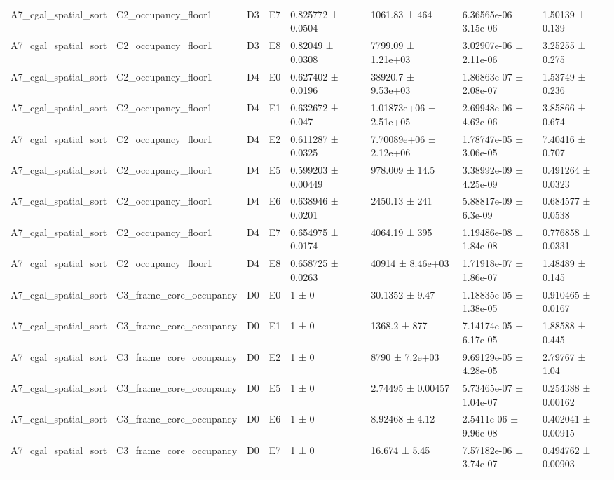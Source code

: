 \begin{table}
\begin{tabular}{lllllllll}
A7\_cgal\_spatial\_sort & C2\_occupancy\_floor1 & D3 & E7 & 0.825772 ± 0.0504 &  & 1061.83 ± 464 & 6.36565e-06 ± 3.15e-06 & 1.50139 ± 0.139 \\
A7\_cgal\_spatial\_sort & C2\_occupancy\_floor1 & D3 & E8 & 0.82049 ± 0.0308 &  & 7799.09 ± 1.21e+03 & 3.02907e-06 ± 2.11e-06 & 3.25255 ± 0.275 \\
A7\_cgal\_spatial\_sort & C2\_occupancy\_floor1 & D4 & E0 & 0.627402 ± 0.0196 &  & 38920.7 ± 9.53e+03 & 1.86863e-07 ± 2.08e-07 & 1.53749 ± 0.236 \\
A7\_cgal\_spatial\_sort & C2\_occupancy\_floor1 & D4 & E1 & 0.632672 ± 0.047 &  & 1.01873e+06 ± 2.51e+05 & 2.69948e-06 ± 4.62e-06 & 3.85866 ± 0.674 \\
A7\_cgal\_spatial\_sort & C2\_occupancy\_floor1 & D4 & E2 & 0.611287 ± 0.0325 &  & 7.70089e+06 ± 2.12e+06 & 1.78747e-05 ± 3.06e-05 & 7.40416 ± 0.707 \\
A7\_cgal\_spatial\_sort & C2\_occupancy\_floor1 & D4 & E5 & 0.599203 ± 0.00449 &  & 978.009 ± 14.5 & 3.38992e-09 ± 4.25e-09 & 0.491264 ± 0.0323 \\
A7\_cgal\_spatial\_sort & C2\_occupancy\_floor1 & D4 & E6 & 0.638946 ± 0.0201 &  & 2450.13 ± 241 & 5.88817e-09 ± 6.3e-09 & 0.684577 ± 0.0538 \\
A7\_cgal\_spatial\_sort & C2\_occupancy\_floor1 & D4 & E7 & 0.654975 ± 0.0174 &  & 4064.19 ± 395 & 1.19486e-08 ± 1.84e-08 & 0.776858 ± 0.0331 \\
A7\_cgal\_spatial\_sort & C2\_occupancy\_floor1 & D4 & E8 & 0.658725 ± 0.0263 &  & 40914 ± 8.46e+03 & 1.71918e-07 ± 1.86e-07 & 1.48489 ± 0.145 \\
A7\_cgal\_spatial\_sort & C3\_frame\_core\_occupancy & D0 & E0 & 1 ± 0 &  & 30.1352 ± 9.47 & 1.18835e-05 ± 1.38e-05 & 0.910465 ± 0.0167 \\
A7\_cgal\_spatial\_sort & C3\_frame\_core\_occupancy & D0 & E1 & 1 ± 0 &  & 1368.2 ± 877 & 7.14174e-05 ± 6.17e-05 & 1.88588 ± 0.445 \\
A7\_cgal\_spatial\_sort & C3\_frame\_core\_occupancy & D0 & E2 & 1 ± 0 &  & 8790 ± 7.2e+03 & 9.69129e-05 ± 4.28e-05 & 2.79767 ± 1.04 \\
A7\_cgal\_spatial\_sort & C3\_frame\_core\_occupancy & D0 & E5 & 1 ± 0 &  & 2.74495 ± 0.00457 & 5.73465e-07 ± 1.04e-07 & 0.254388 ± 0.00162 \\
A7\_cgal\_spatial\_sort & C3\_frame\_core\_occupancy & D0 & E6 & 1 ± 0 &  & 8.92468 ± 4.12 & 2.5411e-06 ± 9.96e-08 & 0.402041 ± 0.00915 \\
A7\_cgal\_spatial\_sort & C3\_frame\_core\_occupancy & D0 & E7 & 1 ± 0 &  & 16.674 ± 5.45 & 7.57182e-06 ± 3.74e-07 & 0.494762 ± 0.00903 \\

\end{tabular}
\end{table}
